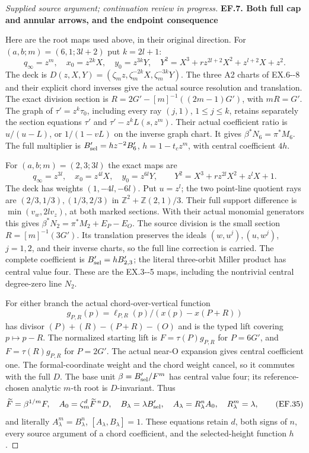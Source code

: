 \begin{proof}[Supplied source argument; continuation review in progress]
\par

\medskip\noindent\textbf{EF.7. Both full cap and annular arrows, and the endpoint consequence}

\par\nobreak

Here are the root maps used above, in their original direction. For
\((a,b;m)=(6,1;3l+2)\) put \(k=2l+1\):
\[
 q_\infty=z^m,\quad x_0=z^{2k}X,\quad y_0=z^{3k}Y,\quad
 Y^2=X^3+r z^{2l+2}X^2+z^{l+2}X+z^2.
 \tag{EF.32}
\]
The deck is
\(D(z,X,Y)=(\zeta_mz,\zeta_m^{-2k}X,\zeta_m^{-3k}Y)\).
The three A2 charts of EX.6-\/-8 and their explicit chord inverses give
the actual source resolution and translation. The exact division
section is
\(R=2G'-[m]^{-1}((2m-1)G')\), with \(mR=G'\).
The graph of \(\tau'=z^k\tau_0\), including every ray
\((j,1)\), \(1\le j\le k\), retains separately the section
equations \(\tau'\) and \(\tau'-z^kL(s,z^m)\). Their actual
coefficient ratio is \(u/(u-L)\), or \(1/(1-vL)\) on the inverse
graph chart. It gives \(\beta^*N_6=\pi^*M_6\). The full multiplier
is \(B'_{\rm sel}=h z^{-2}B'_6\),
\(h=1-t_cz^m\), with central coefficient \(4h\).

For \((a,b;m)=(2,3;3l)\) the exact maps are
\[
 q_\infty=z^{3l},\quad x_0=z^{4l}X,\quad y_0=z^{6l}Y,
 \qquad Y^2=X^3+r z^{2l}X^2+z^lX+1.
 \tag{EF.33}
\]
The deck has weights \((1,-4l,-6l)\). Put \(u=z^l\); the
two point-line quotient rays are \((2/3,1/3),(1/3,2/3)\) in
\(\mathbb Z^2+\mathbb Z(2,1)/3\). Their full support difference
is \(\min(v_w,2l v_z)\), at both marked sections. With their
actual monomial generators this gives
\(\beta^*N_2=\pi^*M_2+E_P-E_O\). The source division is the
small section \(R=[m]^{-1}(3G')\). Its translation preserves the
ideals \((w,u^j),(u,w^j)\), \(j=1,2\), and their inverse charts,
so the full line correction is carried. The complete coefficient is
\(B'_{\rm sel}=hB'_{2,3}\); the literal three-orbit Miller product
has central value four. These are the EX.3-\/-5 maps, including the
nontrivial central degree-zero line \(N_2\).

For either branch the actual chord-over-vertical function
\[
 g_{P,R}(p)=\ell_{P,R}(p)/(x(p)-x(P+R))
 \tag{EF.34}
\]
has divisor \((P)+(R)-(P+R)-(O)\) and is the typed lift covering
\(p\mapsto p-R\). The normalized starting lift is
\(F=\tau(P)g_{P,R}\) for \(P=6G'\), and
\(F=\tau(R)g_{P,R}\) for \(P=2G'\). The actual near-O expansion
gives central coefficient one. The formal-coordinate weight and the
chord weight cancel, so it commutes with the full \(D\). The base
unit \(\beta=B'_{\rm sel}/F^m\) has central value four; its
reference-chosen analytic \(m\)-th root is \(D\)-invariant. Thus
\[
 \widetilde F=\beta^{1/m}F,\quad
 A_0=\zeta_m^d\widetilde F^{\,n}D,\quad
 B_\lambda=\lambda B'_{\rm sel},\quad
 A_\lambda=R_\lambda^n A_0,\quad R_\lambda^m=\lambda,
 \tag{EF.35}
\]
and literally \(A_\lambda^m=B_\lambda^n\),
\([A_\lambda,B_\lambda]=1\). These equations retain \(d\),
both signs of \(n\), every source argument of a chord coefficient,
and the selected-height function \(h\).


\end{proof}
